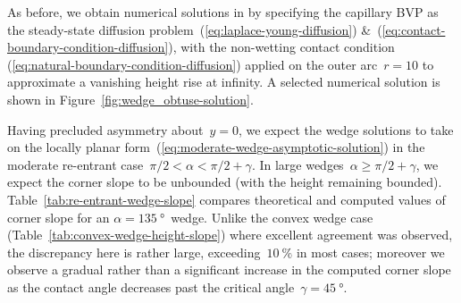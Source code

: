 As before, we obtain numerical solutions in 
by specifying the capillary BVP
as the steady-state diffusion problem~(\ref{eq:laplace-young-diffusion})
\&~(\ref{eq:contact-boundary-condition-diffusion}),
with the non-wetting contact condition~%
  (\ref{eq:natural-boundary-condition-diffusion})
applied on the outer arc~$r = 10$
to approximate a vanishing height rise at infinity.
A selected numerical solution is shown
in Figure~\ref{fig:wedge_obtuse-solution}.

\begin{figure}
\end{figure}

Having precluded asymmetry about~$y = 0$,
we expect the wedge solutions to take on
the locally planar form~(\ref{eq:moderate-wedge-asymptotic-solution})
in the moderate re-entrant case~$\pi/2 < \alpha < \pi/2 + \gamma$.
In large wedges~$\alpha \ge \pi/2 + \gamma$,
we expect the corner slope to be unbounded
(with the height remaining bounded).
Table~\ref{tab:re-entrant-wedge-slope}
compares theoretical and computed values of corner slope
for an $\alpha = \SI{135}{\degree}$~wedge.
Unlike the convex wedge case (Table~\ref{tab:convex-wedge-height-slope})
where excellent agreement was observed,
the discrepancy here is rather large,
exceeding~$\SI{10}{\percent}$ in most cases;
moreover we observe a gradual rather than a significant increase
in the computed corner slope
as the contact angle decreases past
the critical angle~$\gamma = \SI{45}{\degree}$.

